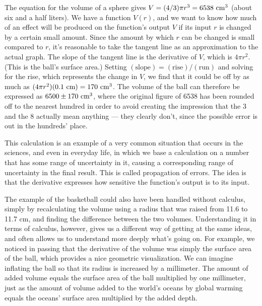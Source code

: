 
The equation for the volume of a sphere gives $V=(4/3)\pi r^3=6538\ \textup{cm}^3$ (about six and
a half liters). We have a function $V(r)$, and we want to know how much of an effect will be
produced on the function's output $V$ if its input $r$ is changed by a certain small amount.
Since the amount by which $r$ can be changed is small compared to $r$, it's reasonable to
take the tangent line as an approximation to the actual graph. The slope of the tangent line
is the derivative of $V$, which is $4\pi r^2$. (This is the ball's surface area.)
Setting $(\text{slope})=(\text{rise})/(\text{run})$
and solving for the rise, which represents the change in $V$, we find that it could be off by
as much as $(4\pi r^2)(0.1\ \textup{cm})=170\ \textup{cm}^3$. The volume of the ball can therefore
be expressed as $6500\pm 170\ \textup{cm}^3$, where the original figure of 6538 has been rounded off
to the nearest hundred in order to avoid creating the impression that the 3 and the 8 actually
mean anything --- they clearly don't, since the possible error is out in the hundreds' place.

This calculation is an example of a very common situation that occurs in the sciences, and even
in everyday life, in which we base a calculation on a number that has some range of uncertainty
in it, causing a corresponding range of uncertainty in the final result. This is called
propagation of errors. The idea is that the derivative expresses how sensitive the function's
output is to its input.

The example of the basketball could also have been handled without calculus, simply by recalculating the volume
using a radius that was raised from 11.6 to 11.7 cm, and finding the difference between the two volumes.
Understanding it in terms of calculus, however, gives us a different way of getting at the same
ideas, and often allows us to understand more deeply what's going on. For example, we noticed in passing that
the derivative of the volume was simply the surface area of the ball, which provides a nice geometric
visualization. We can imagine inflating the ball so that its radius is increased by a millimeter. The amount of
added volume equals the surface area of the ball multiplied by one millimeter, just as the amount of volume
added to the world's oceans by global warming equals the oceans' surface area multiplied by the added depth.

